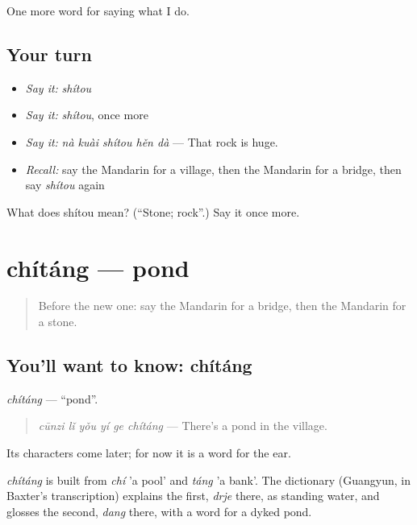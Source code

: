 \begin{grammarlens}[title={What you've built}]
One more word for saying what I do.
\end{grammarlens}

\subsection*{Your turn}
\begin{itemize}
\raggedright
  \item \emph{Say it:} \emph{shítou}
  \item \emph{Say it:} \emph{shítou}, once more
  \item \emph{Say it:} \emph{nà kuài shítou hěn dà} — That rock is huge.
  \item \emph{Recall:} say the Mandarin for a village, then the Mandarin for a bridge, then say \emph{shítou} again
\end{itemize}

\begin{tcolorbox}[breakable,colback=teal!4,colframe=teal!35!black,title={Before you move on}]
What does shítou mean? (\textquotedblleft{}Stone; rock\textquotedblright{}.) Say it once more.
\end{tcolorbox}
\section[chítáng]{chítáng — pond}

\label{lesson:ZH-C246-chitang}



\begin{quote}
Before the new one: say the Mandarin for a bridge, then the Mandarin for a stone.
\end{quote}

\subsection*{You'll want to know: chítáng}
\emph{chítáng} — \textquotedblleft{}pond\textquotedblright{}.

\begin{quote}
\emph{cūnzi lǐ yǒu yí ge chítáng} — There's a pond in the village.
\end{quote}

Its characters come later; for now it is a word for the ear.

\begin{cousinweb}
\emph{chítáng} is built from \emph{chí} 'a pool' and \emph{táng} 'a bank'. The dictionary (Guangyun, in Baxter's transcription) explains the first, \emph{drje} there, as standing water, and glosses the second, \emph{dang} there, with a word for a dyked pond.
\end{cousinweb}

